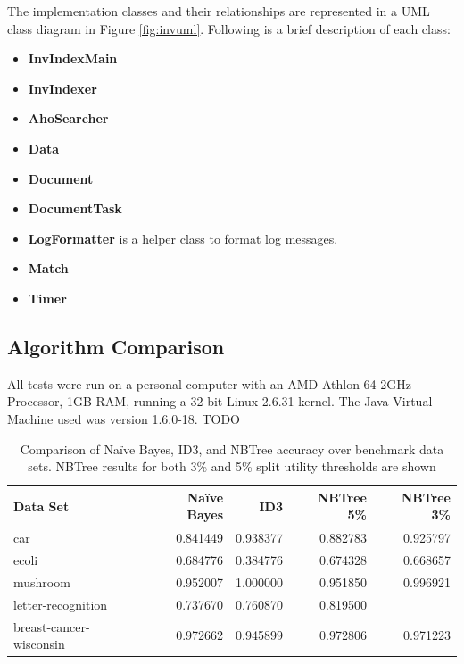\documentclass[10pt]{report}
\begin{document}
The implementation classes and their relationships are represented in a UML
class diagram in Figure \ref{fig:invuml}. Following is a brief
description of each class:

\begin{itemize}
\item \textbf{InvIndexMain}

\item \textbf{InvIndexer}

\item \textbf{AhoSearcher} 

\item \textbf{Data} 

\item \textbf{Document} 

\item \textbf{DocumentTask} 

\item \textbf{LogFormatter} is a helper class to format log messages.

\item \textbf{Match}

\item \textbf{Timer}

\end{itemize}


\subsection*{Algorithm Comparison}
\label{sec:algorithmcomparison}
All tests were run on a personal computer with an AMD Athlon 64 2GHz
Processor, 1GB RAM, running a 32 bit Linux 2.6.31 kernel. The Java
Virtual Machine used was version 1.6.0-18. TODO
\\
\begin{table}[h]
  \centering
  \begin{tabular}{ |l|r|r|r|r|} 
    \hline
    \textbf{Data Set} & \textbf{Na\"{i}ve Bayes} & \textbf{ID3} & \textbf{NBTree 5\%} & \textbf{NBTree 3\%} \\ \hline
    car                      &  0.841449  &  0.938377  & 0.882783  & 0.925797 \\ \hline
    ecoli                    &  0.684776  &  0.384776  & 0.674328  & 0.668657 \\ \hline
    mushroom                 &  0.952007  &  1.000000  & 0.951850  & 0.996921 \\ \hline
    letter-recognition       &  0.737670  &  0.760870  & 0.819500  &          \\ \hline
    breast-cancer-wisconsin  &  0.972662  &  0.945899  & 0.972806  & 0.971223 \\ \hline
  \end{tabular}
  \caption{Comparison of Na\"{i}ve Bayes, ID3, and
    NBTree accuracy over benchmark data sets. NBTree results for both
    3\% and 5\% split utility thresholds are shown}
  \label{tab:comparison}
\end{table}





\end{document}
